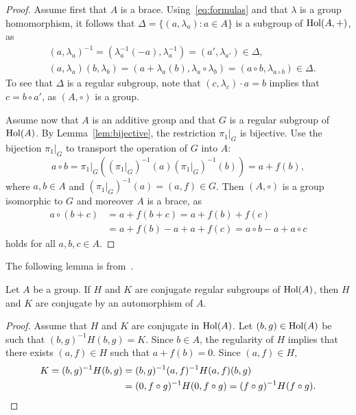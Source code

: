 \begin{proof}
    Assume first that $A$ is a brace. 
    Using~\eqref{eq:formulas} and that 
    $\lambda$ is a group homomorphism, it follows that
    $\Delta=\{(a,\lambda_a):a\in A\}$ is a subgroup of $\operatorname{Hol}(A,+)$, as 
    \begin{align*}
    &(a,\lambda_a)^{-1}=(\lambda^{-1}_a(-a),\lambda^{-1}_a)=(a',\lambda_{a'})\in\Delta,\\
    &(a,\lambda_a)(b,\lambda_b)=(a+\lambda_a(b),\lambda_a\circ\lambda_b)=(a\circ b,\lambda_{a\circ b})\in\Delta.    
    \end{align*}
    To see that $\Delta$ is a regular subgroup, note that $(c,\lambda_c)\cdot a=b$ 
    implies that $c=b\circ a'$, as $(A,\circ)$ is a group. 

	Assume now that $A$ is an additive group and that 
	$G$ is a regular subgroup of $\operatorname{Hol}(A)$. By Lemma~\ref{lem:bijective}, the restriction 
	$\pi_1|_G$ is bijective.  Use the bijection $\pi_1|_G$ to transport the
	operation of $G$ into $A$: 
	\[
        a\circ b=\pi_1|_G\left((\pi_1|_G)^{-1}(a)(\pi_1|_G)^{-1}(b)\right)=a+f(b),
	\]
	where $a,b\in A$ and $(\pi_1|_G)^{-1}(a)=(a,f)\in G$. 
	Then $(A,\circ)$ is a group isomorphic to $G$ and moreover $A$ is a brace, as 
	\begin{align*}
		a\circ (b+c)&=a+f(b+c)=a+f(b)+f(c)\\
		&=a+f(b)-a+a+f(c)=a\circ b-a+a\circ c
	\end{align*}
	holds for all $a,b,c\in A$. 
\end{proof}

The following lemma is from~\cite{MR4113853}.

\begin{lemma}
\label{lem:BNY}
    Let $A$ be a group. If $H$ and $K$ are conjugate regular subgroups of $\operatorname{Hol}(A)$, then $H$ and $K$ are conjugate 
    by an automorphism of $A$. 
\end{lemma}

\begin{proof}
    Assume that $H$ and $K$ are conjugate in $\operatorname{Hol}(A)$. Let $(b,g)\in\operatorname{Hol}(A)$ be such that $(b,g)^{-1}H(b,g)=K$. 
    Since $b\in A$, the regularity of $H$ implies that
    there exists $(a,f)\in H$ such that $a+f(b)=0$. Since $(a,f)\in H$, 
    \begin{align*}
    K=(b,g)^{-1}H(b,g)&=(b,g)^{-1}(a,f)^{-1}H(a,f)(b,g)\\
    &=(0,f\circ g)^{-1}H(0,f\circ g)=(f\circ g)^{-1}H(f\circ g).\qedhere
    \end{align*}
\end{proof}

